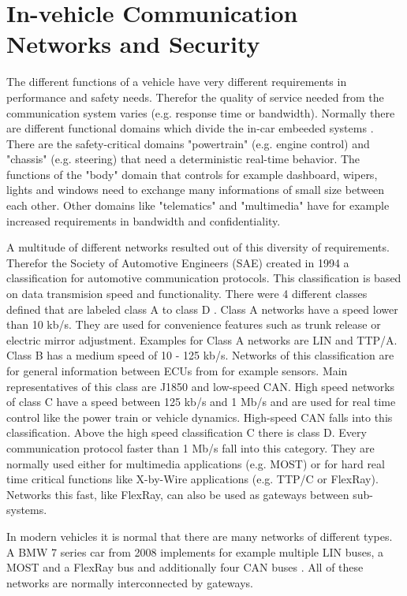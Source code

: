 

\section{In-vehicle Communication Networks and Security}
\label{sec:communication-networks}

The different functions of a vehicle have very different requirements in
performance and safety needs. Therefor the quality of service needed from the
communication system varies (e.g. response time or bandwidth). Normally there
are different functional domains which divide the in-car embeeded systems
\cite{Navet2017}. There are the safety-critical domains "powertrain" (e.g.
engine control) and "chassis" (e.g. steering) that need a deterministic
real-time behavior. The functions of the "body" domain that controls for example
dashboard, wipers, lights and windows need to exchange many informations of
small size between each other. Other domains like "telematics" and "multimedia"
have for example increased requirements in bandwidth and confidentiality.

A multitude of different networks resulted out of this diversity of
requirements. Therefor the Society of Automotive Engineers (SAE) created in 1994
a classification for automotive communication protocols. This classification is
based on data transmision speed and functionality. There were 4 different
classes defined that are labeled class A to class D \cite{Ali2017}. Class A
networks have a speed lower than 10 kb/s. They are used for convenience features
such as trunk release or electric mirror adjustment. Examples for Class A
networks are LIN and TTP/A. Class B has a medium speed of 10 - 125 kb/s.
Networks of this classification are for general information between ECUs from
for example sensors. Main representatives of this class are J1850 and low-speed
CAN. High speed networks of class C have a speed between 125 kb/s and 1 Mb/s and
are used for real time control like the power train or vehicle dynamics.
High-speed CAN falls into this classification. Above the high speed
classification C there is class D. Every communication protocol faster than 1
Mb/s fall into this category. They are normally used either for multimedia
applications (e.g. MOST) or for hard real time critical functions like X-by-Wire
applications (e.g. TTP/C or FlexRay). Networks this fast, like FlexRay, can also
be used as gateways between sub-systems.

In modern vehicles it is normal that there are many networks of different types.
A BMW 7 series car from 2008 implements for example multiple LIN buses, a MOST
and a FlexRay bus and additionally four CAN buses \cite{Kellermann2008}. All of
these networks are normally interconnected by gateways.


